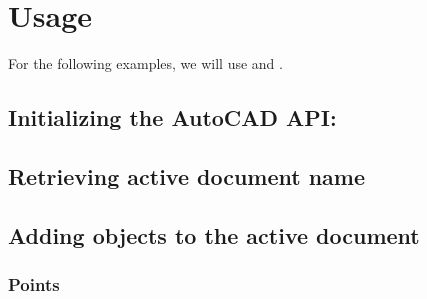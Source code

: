 \documentclass[a4paper,10pt,english]{sphinxmanual}
\begin{document}
\sphinxstepscope


\chapter{Usage}
\label{\detokenize{usage:usage}}\label{\detokenize{usage::doc}}
\sphinxAtStartPar
For the following examples, we will use  and .

\begin{sphinxVerbatim}[commandchars=\\\{\}]
   
\end{sphinxVerbatim}


\section{Initializing the AutoCAD API:}
\label{\detokenize{usage:initializing-the-autocad-api}}
\begin{sphinxVerbatim}[commandchars=\\\{\}]
  
\end{sphinxVerbatim}


\section{Retrieving active document name}
\label{\detokenize{usage:retrieving-active-document-name}}
\begin{sphinxVerbatim}[commandchars=\\\{\}]

\end{sphinxVerbatim}


\section{Adding objects to the active document}
\label{\detokenize{usage:adding-objects-to-the-active-document}}

\subsection{Points}
\label{\detokenize{usage:points}}
\begin{sphinxVerbatim}[commandchars=\\\{\}]
   
  
\end{sphinxVerbatim}
\end{document}
